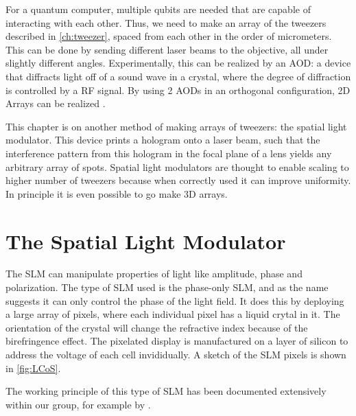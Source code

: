 For a quantum computer, multiple qubits are needed that are capable of interacting with each other. Thus, we need to make an array of the tweezers described in \cref{ch:tweezer}, spaced from each other in the order of micrometers. This can be done by sending different laser beams to the objective, all under slightly different angles. Experimentally, this can be realized by an \ac{AOD}: a device that diffracts light off of a sound wave in a crystal, where the degree of diffraction is controlled by a RF signal. By using 2 AODs in an orthogonal configuration, 2D Arrays can be realized \cite{Manuel2016}.



This chapter is on another method of making arrays of tweezers: the spatial light modulator. This device prints a hologram onto a laser beam, such that the interference pattern from this hologram in the focal plane of a lens yields any arbitrary array of spots. Spatial light modulators are thought to enable scaling to higher number of tweezers because when correctly used it can improve uniformity. In principle it is even possible to go make 3D arrays. 

\section{The Spatial Light Modulator}

The \ac{SLM} can manipulate properties of light like amplitude, phase and polarization. The type of SLM used is the phase-only SLM, and as the name suggests it can only control the phase of the light field. It does this by deploying a large array of pixels, where each individual pixel has a liquid crytal in it. The orientation of the crystal will change the refractive index because of the birefringence effect. The pixelated display is manufactured on a layer of silicon to address the voltage of each cell invididually. A sketch of the SLM pixels is shown in \cref{fig:LCoS}.

The working principle of this type of SLM has been documented extensively within our group, for example by \cite{Dijk2012,Bijnen2013,Bijnen2015}. 

